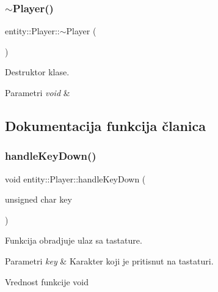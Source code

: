 \subsubsection{\texorpdfstring{$\sim$\+Player()}{~Player()}}
{\footnotesize\ttfamily entity\+::\+Player\+::$\sim$\+Player (\begin{DoxyParamCaption}{ }\end{DoxyParamCaption})}



Destruktor klase. 


\begin{DoxyParams}{Parametri}
{\em void} & \\
\hline
\end{DoxyParams}


\subsection{Dokumentacija funkcija članica}
\mbox{\label{classentity_1_1Player_af3d0b548d6daeb37d03f9fa57fb28f8a}} 
\subsubsection{\texorpdfstring{handle\+Key\+Down()}{handleKeyDown()}}
{\footnotesize\ttfamily void entity\+::\+Player\+::handle\+Key\+Down (\begin{DoxyParamCaption}\item[{unsigned char}]{key }\end{DoxyParamCaption})}



Funkcija obradjuje ulaz sa tastature. 


\begin{DoxyParams}{Parametri}
{\em key} & Karakter koji je pritisnut na tastaturi. \\
\hline
\end{DoxyParams}
\begin{DoxyReturn}{Vrednost funkcije}
void 
\end{DoxyReturn}
\mbox{\label{classentity_1_1Player_a27a2007873610439598c0ac07a91f3ac}} 
